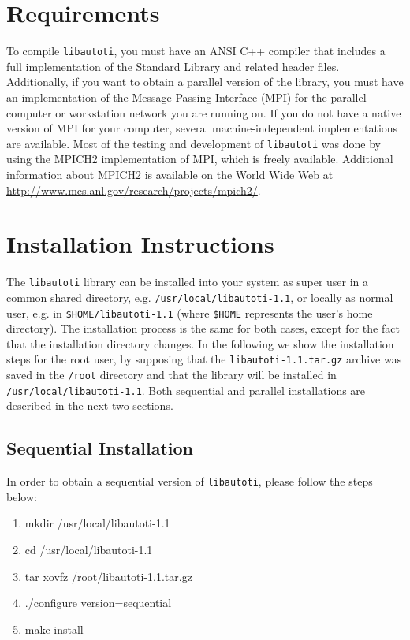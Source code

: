 \section{Requirements}

To compile \verb"libautoti", you must have an ANSI C++ compiler
that includes a full implementation of the Standard Library and
related header files. Additionally, if you want to obtain a
parallel version of the library, you must have an implementation
of the Message Passing Interface (MPI) for the parallel computer
or workstation network you are running on. If you do not have a
native version of MPI for your computer, several
machine-independent implementations are available. Most of the
testing and development of \verb"libautoti" was done by using the
MPICH2 implementation of MPI, which is freely available.
Additional information about MPICH2 is available on the World Wide
Web at \url{http://www.mcs.anl.gov/research/projects/mpich2/}.



\section{Installation Instructions}

The \verb"libautoti" library can be installed into your system as
super user in a common shared directory, e.g.
\verb"/usr/local/libautoti-1.1", or locally as normal user, e.g.
in \verb"$HOME/libautoti-1.1" (where \verb"$HOME" represents the
user's home directory). The installation process is the same for
both cases, except for the fact that the installation directory
changes. In the following we show the installation steps for the
root user, by supposing that the \verb"libautoti-1.1.tar.gz"
archive was saved in the \verb"/root" directory and that the
library will be installed in \verb"/usr/local/libautoti-1.1". Both
sequential and parallel installations are described in the next
two sections.

\subsection{Sequential Installation}

In order to obtain a sequential version of \verb"libautoti",
please follow the steps below:

\begin{enumerate}

    \item mkdir /usr/local/libautoti-1.1

    \item cd /usr/local/libautoti-1.1

    \item tar xovfz /root/libautoti-1.1.tar.gz

    \item ./configure version=sequential

    \item make install

\end{enumerate}

